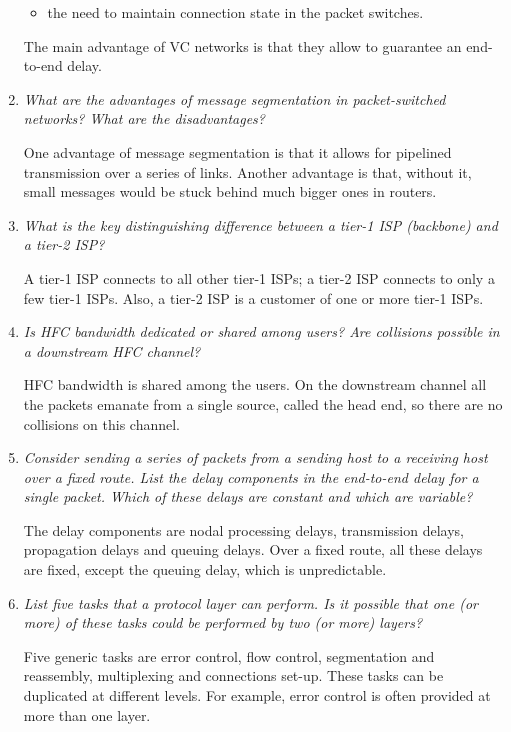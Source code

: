 \begin{enumerate}
\begin{itemize}
     \item the need to maintain connection state in the packet
       switches.

   \end{itemize}
   The main advantage of VC networks is that they allow to guarantee
   an end-to-end delay.

  \item \emph{What are the advantages of message segmentation in
    packet-switched networks? What are the disadvantages?}

  One advantage of message segmentation is that it allows for
  pipelined transmission over a series of links. Another advantage is
  that, without it, small messages would be stuck behind much bigger
  ones in routers.

  \item \emph{What is the key distinguishing difference between a
    tier-1 ISP (backbone) and a tier-2 ISP?}

  A tier-1 ISP connects to all other tier-1 ISPs; a tier-2 ISP
  connects to only a few tier-1 ISPs. Also, a tier-2 ISP is a customer
  of one or more tier-1 ISPs.

  \item \emph{Is HFC bandwidth dedicated or shared among users? Are
    collisions possible in a downstream HFC channel?}

  HFC bandwidth is shared among the users. On the downstream channel
  all the packets emanate from a single source, called the head end,
  so there are no collisions on this channel.

  \item \emph{Consider sending a series of packets from a sending host
    to a receiving host over a fixed route. List the delay components
    in the end-to-end delay for a single packet. Which of these delays
    are constant and which are variable?}

  The delay components are nodal processing delays, transmission
  delays, propagation delays and queuing delays. Over a fixed route,
  all these delays are fixed, except the queuing delay, which is
  unpredictable.

  \item \emph{List five tasks that a protocol layer can perform. Is it
    possible that one (or more) of these tasks could be performed by
    two (or more) layers?}
   
  Five generic tasks are error control, flow control, segmentation and
  reassembly, multiplexing and connections set-up. These tasks can be
  duplicated at different levels. For example, error control is often
  provided at more than one layer.
  

\end{enumerate}
